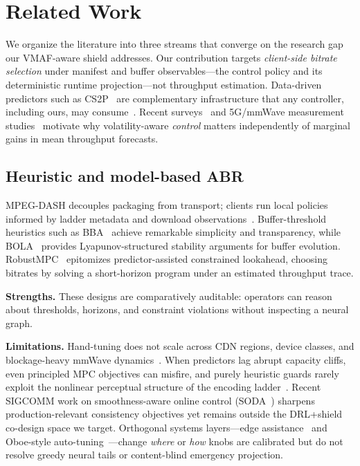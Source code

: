 \documentclass[preprint,12pt,times]{elsarticle}
\begin{document}
\section{Related Work}
\label{sec:related}

We organize the literature into three streams that converge on the research gap our VMAF-aware shield addresses.
Our contribution targets \emph{client-side bitrate selection} under manifest and buffer observables---the control policy and its deterministic runtime projection---not throughput estimation.
Data-driven predictors such as CS2P~\cite{sun2016cs2p} are complementary infrastructure that any controller, including ours, may consume~\cite{yin2015control,mao2017neural}.
Recent surveys~\cite{bentaleb2018survey,wu2024qoe} and 5G/mmWave measurement studies~\cite{meng2024mmwave} motivate why volatility-aware \emph{control} matters independently of marginal gains in mean throughput forecasts.

\subsection{Heuristic and model-based ABR}

MPEG-DASH decouples packaging from transport; clients run local policies informed by ladder metadata and download observations~\cite{sodagar2011mpeg}.
Buffer-threshold heuristics such as BBA~\cite{huang2014buffer} achieve remarkable simplicity and transparency, while BOLA~\cite{spiteri2018bola} provides Lyapunov-structured stability arguments for buffer evolution.
RobustMPC~\cite{yin2015control} epitomizes predictor-assisted constrained lookahead, choosing bitrates by solving a short-horizon program under an estimated throughput trace.

\textbf{Strengths.} These designs are comparatively auditable: operators can reason about thresholds, horizons, and constraint violations without inspecting a neural graph.

\textbf{Limitations.} Hand-tuning does not scale across CDN regions, device classes, and blockage-heavy mmWave dynamics~\cite{meng2024mmwave,cisco2023}.
When predictors lag abrupt capacity cliffs, even principled MPC objectives can misfire, and purely heuristic guards rarely exploit the nonlinear perceptual structure of the encoding ladder~\cite{li2016vmaf}.
Recent SIGCOMM work on smoothness-aware online control (SODA~\cite{chen2024soda}) sharpens production-relevant consistency objectives yet remains outside the DRL+shield co-design space we target.
Orthogonal systems layers---edge assistance~\cite{mehrabi2019edge,kim2023http,kang2023adaptive} and Oboe-style auto-tuning~\cite{akhtar2018oboe}---change \emph{where} or \emph{how} knobs are calibrated but do not resolve greedy neural tails or content-blind emergency projection.
\end{document}
